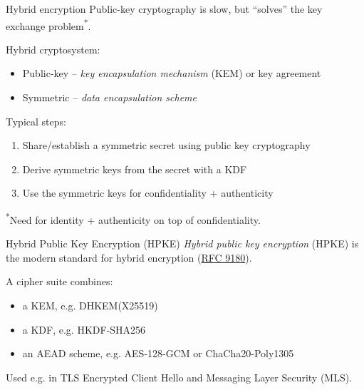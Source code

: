 \begin{frame}{Hybrid encryption}
  Public-key cryptography is slow, but \enquote{solves} the key exchange problem\textsuperscript{*}.

  \pause
  Hybrid cryptosystem:
  \begin{itemize}
    \item Public-key -- \emph{key encapsulation mechanism} (KEM) or key agreement
    \item Symmetric -- \emph{data encapsulation scheme}
  \end{itemize}

  \vspace*{0.5em}

  \pause
  Typical steps:
  \begin{enumerate}[<+(1)->]
    \item Share/establish a symmetric secret using public key cryptography
    \item Derive symmetric keys from the secret with a KDF
    \item Use the symmetric keys for confidentiality + authenticity
  \end{enumerate}

  \vspace*{0.5em}

  \pause
  {\scriptsize \textsuperscript{*}Need for identity + authenticity on top of confidentiality.}
\end{frame}

\begin{frame}{Hybrid Public Key Encryption (HPKE)}
  \emph{Hybrid public key encryption} (HPKE) is the modern standard for hybrid encryption (\href{https://datatracker.ietf.org/doc/html/rfc9180}{RFC 9180}).

  \vspace*{1em}

  \pause
  A cipher suite combines:
  \begin{itemize}[<+(1)->]
    \item a KEM, e.g. DHKEM(X25519)
    \item a KDF, e.g. HKDF-SHA256
    \item an AEAD scheme, e.g. AES-128-GCM or ChaCha20-Poly1305
  \end{itemize}

  \vspace*{1em}

  \pause
  Used e.g. in TLS Encrypted Client Hello and Messaging Layer Security (MLS).
\end{frame}

